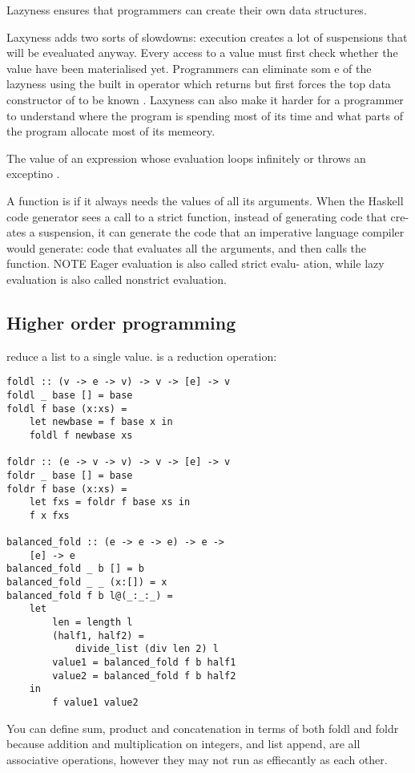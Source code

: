 \begin{compactitem}
\item Lazyness ensures that programmers can create their own data structures. 

\item Laxyness adds two sorts of slowdowns: execution creates a lot of suspensions that will be evealuated anyway. Every access to a value must first check whether the value have been materialised yet. Programmers can eliminate som e of the lazyness using the built in operator  which returns  but first forces the top data constructor of  to be known . Laxyness can also make it harder for a programmer to understand where the program is spending most of its time and what parts of the program allocate most of its memeory. 

\item The value of an expression whose evaluation loops infinitely or throws an exceptino .
\item A function is  if it always needs the values of
all its arguments. When the Haskell code generator sees a call to a
strict function, instead of generating code that cre-
ates a suspension, it can generate the code that an
imperative language compiler would generate: code
that evaluates all the arguments, and then calls the
function.
NOTE Eager evaluation is also called strict evalu-
ation, while lazy evaluation is also called nonstrict
evaluation.

\subsection{Higher order programming}
\item {} reduce a list to a single value.  is a reduction operation: 
\begin{lstlisting}
foldl :: (v -> e -> v) -> v -> [e] -> v
foldl _ base [] = base
foldl f base (x:xs) =
    let newbase = f base x in
    foldl f newbase xs

foldr :: (e -> v -> v) -> v -> [e] -> v
foldr _ base [] = base
foldr f base (x:xs) =
    let fxs = foldr f base xs in
    f x fxs
    
balanced_fold :: (e -> e -> e) -> e ->
    [e] -> e
balanced_fold _ b [] = b
balanced_fold _ _ (x:[]) = x
balanced_fold f b l@(_:_:_) =
    let
        len = length l
        (half1, half2) =
            divide_list (div len 2) l
        value1 = balanced_fold f b half1
        value2 = balanced_fold f b half2
    in
        f value1 value2
\end{lstlisting}
You can define sum, product and concatenation in
terms of both foldl and foldr because addition
and multiplication on integers, and list append, are
all associative operations, however they may not run as effiecantly as each other. 


\end{compactitem}
